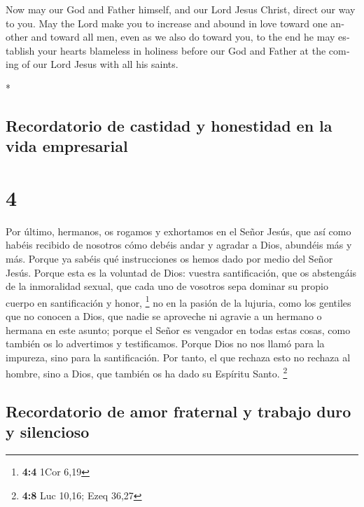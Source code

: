 \begin{paracol}{2}
\begin{otherlanguage}{english}
 Now may our God and Father himself, and our Lord Jesus
Christ, direct our way to you.  May the Lord make you to
increase and abound in love toward one another and toward all men, even
as we also do toward you,  to the end he may establish
your hearts blameless in holiness before our God and Father at the
coming of our Lord Jesus with all his saints.

\end{otherlanguage}

\switchcolumn[0]*

\hypertarget{recordatorio-de-castidad-y-honestidad-en-la-vida-empresarial}{%
\subsection{Recordatorio de castidad y honestidad en la vida
empresarial}\label{recordatorio-de-castidad-y-honestidad-en-la-vida-empresarial}}

\hypertarget{section-6}{%
\section{4}\label{section-6}}

 Por último, hermanos, os rogamos y exhortamos en el Señor
Jesús, que así como habéis recibido de nosotros cómo debéis andar y
agradar a Dios, abundéis más y más.  Porque ya sabéis qué
instrucciones os hemos dado por medio del Señor Jesús. 
Porque esta es la voluntad de Dios: vuestra santificación, que os
abstengáis de la inmoralidad sexual,  que cada uno de
vosotros sepa dominar su propio cuerpo en santificación y honor,
\footnote{\textbf{4:4} 1Cor 6,19}  no en la pasión de la
lujuria, como los gentiles que no conocen a Dios,  que
nadie se aproveche ni agravie a un hermano o hermana en este asunto;
porque el Señor es vengador en todas estas cosas, como también os lo
advertimos y testificamos.  Porque Dios no nos llamó para
la impureza, sino para la santificación.  Por tanto, el
que rechaza esto no rechaza al hombre, sino a Dios, que también os ha
dado su Espíritu Santo. \footnote{\textbf{4:8} Luc 10,16; Ezeq 36,27}

\hypertarget{recordatorio-de-amor-fraternal-y-trabajo-duro-y-silencioso}{%
\subsection{Recordatorio de amor fraternal y trabajo duro y
silencioso}\label{recordatorio-de-amor-fraternal-y-trabajo-duro-y-silencioso}}


\end{paracol}
